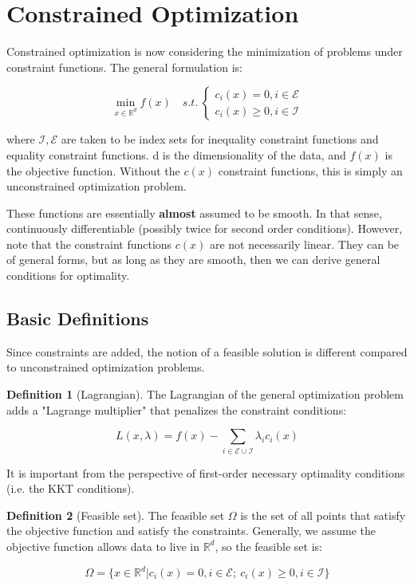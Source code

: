 \documentclass[class=article, crop=false]{standalone}
\theoremstyle{definition}
\newtheorem{definition}{Definition}[section]
\theoremstyle{remark}
\theoremstyle{lemma}
\theoremstyle{theorem}
\theoremstyle{corollary}
\theoremstyle{property}
\begin{document}
\section{Constrained Optimization}
	Constrained optimization is now considering the minimization of problems under constraint functions. The general formulation is:

		$$\min_{x \in \mathbb{R}^d} f(x) \quad s.t.\ \begin{cases} c_i(x) = 0, i \in \mathcal{E} \\ c_i(x) \ge 0, i \in \mathcal{I} \end{cases}$$

	where $\mathcal{I}, \mathcal{E}$ are taken to be index sets for inequality constraint functions and equality constraint functions. d is the dimensionality of the data, and $f(x)$ is the objective function. Without the $c(x)$ constraint functions, this is simply an unconstrained optimization problem.

	These functions are essentially \textbf{almost} assumed to be smooth. In that sense, continuously differentiable (possibly twice for second order conditions). However, note that the constraint functions $c(x)$ are not necessarily linear. They can be of general forms, but as long as they are smooth, then we can derive general conditions for optimality.

	\subsection{Basic Definitions}
		Since constraints are added, the notion of a feasible solution is different compared to unconstrained optimization problems.

		\begin{definition}[Lagrangian]
			The Lagrangian of the general optimization problem adds a "Lagrange multiplier" that penalizes the constraint conditions:

			$$L(x, \lambda) = f(x) - \sum_{i \in \mathcal{E} \cup \mathcal{I}} \lambda_i c_i(x)$$

			It is important from the perspective of first-order necessary optimality conditions (i.e. the KKT conditions).
		\end{definition}

		\begin{definition}[Feasible set]
			The feasible set $\Omega$ is the set of all points that satisfy the objective function and satisfy the constraints. Generally, we assume the objective function allows data to live in $\mathbb{R}^d$, so the feasible set is:

				$$\Omega = \{x \in \mathbb{R}^d | c_i(x) = 0, i \in \mathcal{E};\ c_i(x) \ge 0, i \in \mathcal{I} \}$$
		\end{definition}
\end{document}

